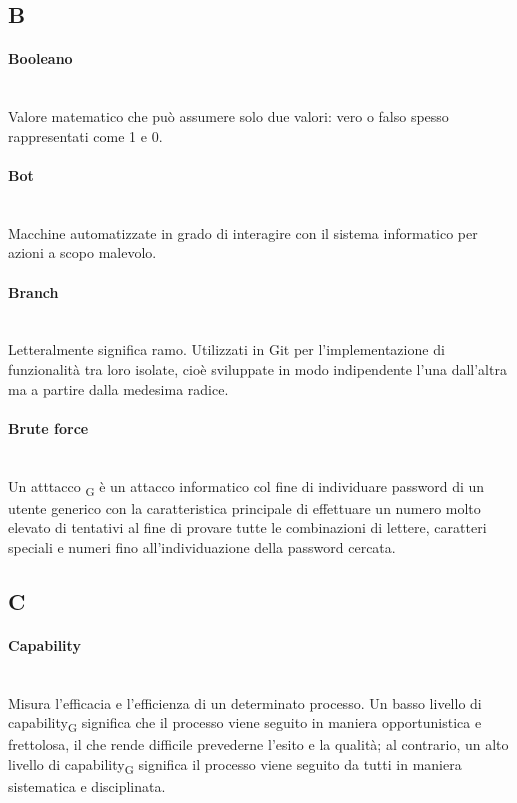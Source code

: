 \subsection*{B}
\paragraph{Booleano}~\smallskip \\
Valore matematico che può assumere solo due valori: vero o falso spesso rappresentati come 1 e 0.

\paragraph{Bot}~\smallskip \\
Macchine automatizzate in grado di interagire con il sistema informatico per azioni a scopo malevolo.

\paragraph{Branch}~\smallskip \\
Letteralmente significa ramo. Utilizzati in Git per l'implementazione di funzionalità tra loro isolate, cioè sviluppate in modo indipendente l'una dall'altra ma a partire dalla medesima radice.

\paragraph{Brute force}~\smallskip \\
Un atttacco \textsubscript{G} è un attacco informatico col fine di individuare password di un utente generico con la caratteristica principale di effettuare un numero molto elevato di tentativi al fine di provare tutte le combinazioni di lettere, caratteri speciali e numeri fino all'individuazione della password cercata.
\newpage
{}
\subsection*{C}
\paragraph{Capability}~\smallskip \\
Misura l'efficacia e l'efficienza di un determinato processo. Un basso livello di capability\textsubscript{G} significa che il processo viene seguito in maniera opportunistica e frettolosa, il che rende difficile prevederne l'esito e la qualità; al contrario, un alto livello di capability\textsubscript{G} significa il processo viene seguito da tutti in maniera sistematica e disciplinata.

